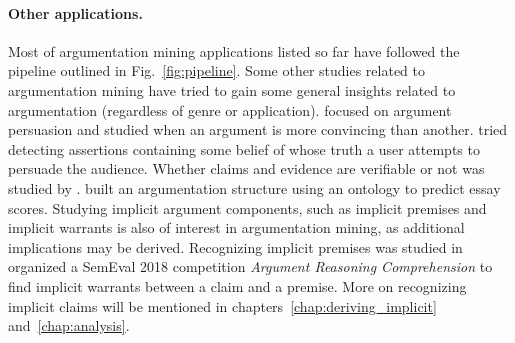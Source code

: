 \paragraph{Other applications. } Most of argumentation mining
applications listed so far have followed 
the pipeline outlined in Fig.~\ref{fig:pipeline}. 
Some other studies related to argumentation mining have tried to gain 
some general insights related to argumentation (regardless of genre or application). 
\citet{habernal2016argument} focused on argument persuasion and studied
when an argument is more convincing than another. 
\citet{rosenthal2012detecting} tried detecting assertions containing some belief
of whose truth a user attempts to persuade the audience.
Whether claims and evidence are verifiable or not was studied by
\citep{park2014identifying, park2015conditional}.
\citet{ong2014ontology} built an argumentation structure using an ontology to
predict essay scores. 
Studying implicit argument components, such as implicit premises and implicit
warrants is also of interest in argumentation mining, as additional
implications may be derived. Recognizing implicit premises was studied in
\citep{park2015conditional, boltuzic2016fill} \citet{habernal2017argument}
organized a SemEval 2018 competition \emph{Argument Reasoning Comprehension} to
find implicit warrants between a claim and a premise.  More on recognizing
implicit claims will be mentioned in chapters~\ref{chap:deriving_implicit}
and~\ref{chap:analysis}.



